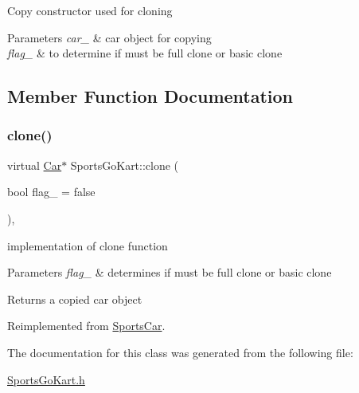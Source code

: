 Copy constructor used for cloning 
\begin{DoxyParams}{Parameters}
{\em car\+\_\+} & car object for copying \\
\hline
{\em flag\+\_\+} & to determine if must be full clone or basic clone \\
\hline
\end{DoxyParams}


\subsection{Member Function Documentation}
\mbox{\label{class_sports_go_kart_abff0ab942e347968f49a3ebf600b19fe}} 
\subsubsection{\texorpdfstring{clone()}{clone()}}
{\footnotesize\ttfamily virtual \mbox{\hyperlink{class_car}{Car}}$\ast$ Sports\+Go\+Kart\+::clone (\begin{DoxyParamCaption}\item[{bool}]{flag\+\_\+ = {\ttfamily false} }\end{DoxyParamCaption})\hspace{0.3cm}{\ttfamily [inline]}, {\ttfamily [virtual]}}

implementation of clone function 
\begin{DoxyParams}{Parameters}
{\em flag\+\_\+} & determines if must be full clone or basic clone \\
\hline
\end{DoxyParams}
\begin{DoxyReturn}{Returns}
a copied car object 
\end{DoxyReturn}


Reimplemented from \mbox{\hyperlink{class_sports_car_a4daa739baaee9d9d5ad33f4766ec43ec}{Sports\+Car}}.



The documentation for this class was generated from the following file\+:\begin{DoxyCompactItemize}
\item 
\mbox{\hyperlink{_sports_go_kart_8h}{Sports\+Go\+Kart.\+h}}\end{DoxyCompactItemize}
